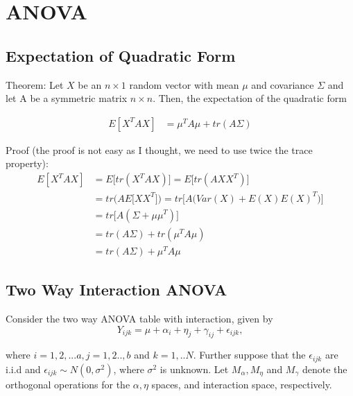 
 \section{ANOVA}

\subsection{Expectation of Quadratic Form}
Theorem: Let $X$ be an $n \times 1$ random vector with mean $\mu$ and covariance $\Sigma$ and let A be a symmetric matrix $n \times n$. Then, the expectation of the quadratic form 

\begin{align*}
  E[X^T A X] &= \mu^T A \mu + tr(A \Sigma) 
\end{align*}

Proof (the proof is not easy as I thought, we need to use twice the trace property):
\begin{align*}
  E[X^T A X] &= E \Big[ tr(X^T A X) \Big] = E \Big[ tr(A X X^T ) \Big] \\
  &= tr \Big( A E \Big[ X X^T  \Big] \Big) =  tr \Big[ A \Big( Var(X) + E(X) E(X)^T  \Big) \Big] \\
  &= tr \Big[ A ( \Sigma+ \mu \mu^T) \Big] \\
  &= tr(A\Sigma) + tr(\mu^T A \mu) \\
  &= tr(A\Sigma) + \mu^T A \mu
\end{align*}


\subsection{Two Way Interaction ANOVA}

 Consider the two way ANOVA table with interaction, given by
   \[ 
   Y_{ijk}  = \mu + \alpha_i + \eta_j + \gamma_{ij} + \epsilon_{ijk},
    \] 
    
 where $i=1,2,...a, j=1,2.., b$ and $k=1,..N$. Further suppose that the $\epsilon_{ijk}$ are i.i.d and $\epsilon_{ijk} \sim N(0, \sigma^2)$, where $\sigma^2$ is unknown. Let $M_{\alpha}, M_{\eta}$ and $M_{\gamma}$ denote the orthogonal operations for the $\alpha, \eta$ spaces, and interaction space, respectively.  
 
